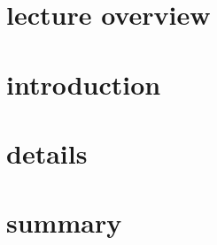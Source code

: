 


\subtitle{Part 2: Introduction}


	

    \section[overview]{lecture overview}
    \section[intro]{introduction}
    \section[details]{details}
    \section{summary}





